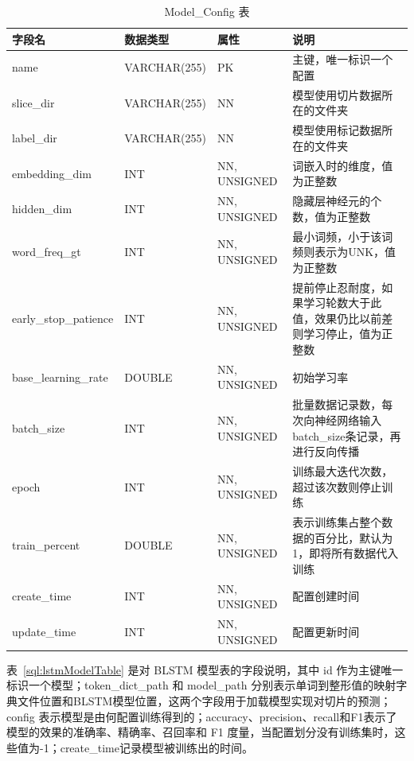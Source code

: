 \begin{table}[H]\footnotesize %
	\centering
	\caption{Model\_Config 表}
	\begin{tabular}{L{2.2cm}L{2cm}L{2.6cm}L{6cm}}
		\toprule
		\textbf{字段名}&\textbf{数据类型}&\textbf{属性}&\textbf{说明}\\
		\midrule
		name 						&VARCHAR(255)&PK&主键，唯一标识一个配置\\
		slice\_dir		 			&VARCHAR(255)&NN&模型使用切片数据所在的文件夹\\
		label\_dir		 			&VARCHAR(255)&NN&模型使用标记数据所在的文件夹\\
		embedding\_dim		  &INT&NN, UNSIGNED&词嵌入时的维度，值为正整数\\
		hidden\_dim				&INT&NN, UNSIGNED&隐藏层神经元的个数，值为正整数\\
		word\_freq\_gt			&INT&NN, UNSIGNED&最小词频，小于该词频则表示为UNK，值为正整数\\
		early\_stop\_patience		&INT&NN, UNSIGNED&提前停止忍耐度，如果学习轮数大于此值，效果仍比以前差则学习停止，值为正整数\\
		base\_learning\_rate		&DOUBLE&NN, UNSIGNED&初始学习率\\
		batch\_size					&INT&NN, UNSIGNED&批量数据记录数，每次向神经网络输入batch\_size条记录，再进行反向传播\\
		epoch						&INT&NN, UNSIGNED&训练最大迭代次数，超过该次数则停止训练\\
		train\_percent						&DOUBLE&NN, UNSIGNED&表示训练集占整个数据的百分比，默认为1，即将所有数据代入训练\\
		create\_time				&INT&NN, UNSIGNED&配置创建时间\\
		update\_time				&INT&NN, UNSIGNED&配置更新时间\\
		\bottomrule
	\end{tabular}
	\label{sql:modelConfigTable}
\end{table}

表~\ref{sql:lstmModelTable} 是对 BLSTM 模型表的字段说明，其中 id 作为主键唯一标识一个模型；token\_dict\_path 和 model\_path 分别表示单词到整形值的映射字典文件位置和BLSTM模型位置，这两个字段用于加载模型实现对切片的预测；config 表示模型是由何配置训练得到的；accuracy、precision、recall和F1表示了模型的效果的准确率、精确率、召回率和 F1 度量，当配置划分没有训练集时，这些值为-1；create\_time记录模型被训练出的时间。

